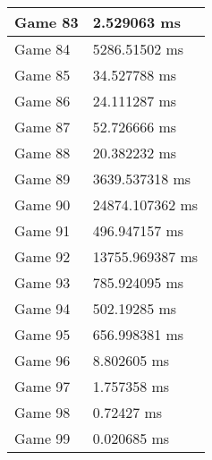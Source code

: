 \begin{tabular}{|l|l|}
	Game 83 & 2.529063 ms \\ \hline
	Game 84 & 5286.51502 ms \\ \hline
	Game 85 & 34.527788 ms \\ \hline
	Game 86 & 24.111287 ms \\ \hline
	Game 87 & 52.726666 ms \\ \hline
	Game 88 & 20.382232 ms \\ \hline
	Game 89 & 3639.537318 ms \\ \hline
	Game 90 & 24874.107362 ms \\ \hline
	Game 91 & 496.947157 ms \\ \hline
	Game 92 & 13755.969387 ms \\ \hline
	Game 93 & 785.924095 ms \\ \hline
	Game 94 & 502.19285 ms \\ \hline
	Game 95 & 656.998381 ms \\ \hline
	Game 96 & 8.802605 ms \\ \hline
	Game 97 & 1.757358 ms \\ \hline
	Game 98 & 0.72427 ms \\ \hline
	Game 99 & 0.020685 ms \\ \hline
\end{tabular}
